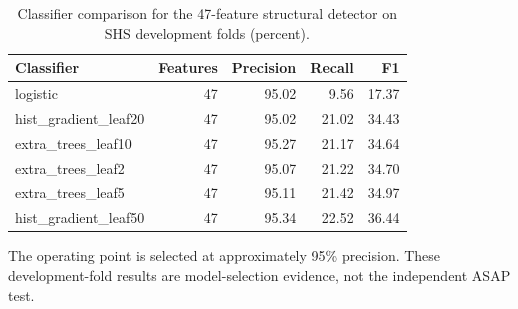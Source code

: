 \begin{table}[t]
\caption{Classifier comparison for the 47-feature structural detector on SHS development folds (percent).}
\label{tab:detector-selection}
\centering
\scriptsize
\begin{tabular}{lrrrr}
\toprule
Classifier & Features & Precision & Recall & F1 \\
\midrule
logistic & 47 & 95.02 & 9.56 & 17.37 \\
hist\_gradient\_leaf20 & 47 & 95.02 & 21.02 & 34.43 \\
extra\_trees\_leaf10 & 47 & 95.27 & 21.17 & 34.64 \\
extra\_trees\_leaf2 & 47 & 95.07 & 21.22 & 34.70 \\
extra\_trees\_leaf5 & 47 & 95.11 & 21.42 & 34.97 \\
hist\_gradient\_leaf50 & 47 & 95.34 & 22.52 & 36.44 \\
\bottomrule
\end{tabular}
\vspace{2pt}
\begin{minipage}{\columnwidth}
\footnotesize The operating point is selected at approximately 95\% precision. These development-fold results are model-selection evidence, not the independent ASAP test.
\end{minipage}
\end{table}

